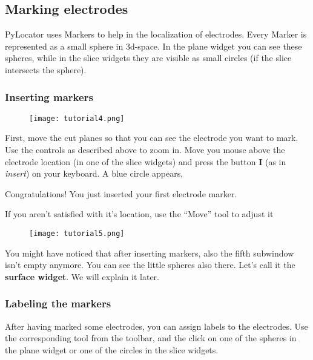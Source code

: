 \documentclass[letterpaper,10pt,english]{sphinxmanual}
\begin{document}
\subsection{Marking electrodes}
\label{tutorial:marking-electrodes}
PyLocator uses Markers to help in the localization of electrodes. Every Marker is represented
as a small sphere in 3d-space. In the plane widget you can see these spheres, while in the
slice widgets they are visible as small circles (if the slice intersects the sphere).


\subsubsection{Inserting markers}
\label{tutorial:inserting-markers}\begin{figure}[htbp]\begin{flushright}

\texttt{[image: tutorial4.png]}
\end{flushright}\end{figure}

First, move the cut planes so that you can see the electrode you want to mark. Use the
controls as described above to zoom in. Move you mouse above the electrode location (in one of
the slice widgets) and press the button \textbf{I} (as in \emph{insert}) on your keyboard. A blue circle appears,

Congratulations! You just inserted your first electrode marker.

If you aren't satisfied with it's location, use the ``Move'' tool to adjust it
\begin{figure}[htbp]
\centering

\texttt{[image: tutorial5.png]}
\end{figure}

You might have noticed that after inserting markers, also the fifth subwindow isn't empty anymore.
You can see the little spheres also there. Let's call it the \textbf{surface widget}. We will explain it
later.


\subsubsection{Labeling the markers}
\label{tutorial:labeling-the-markers}
After having marked some electrodes, you can assign labels to the electrodes. Use the corresponding
tool from the toolbar, and the click on one of the spheres in the plane widget or one of the circles
in the slice widgets.
\end{document}
